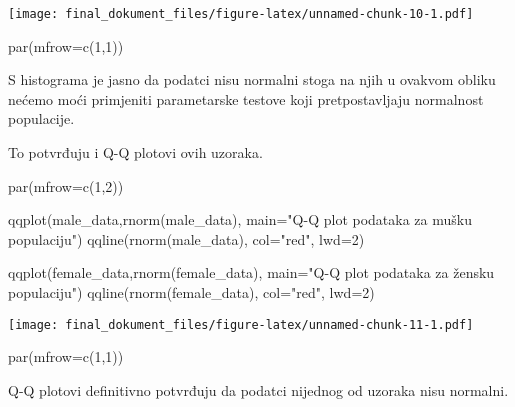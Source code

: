\documentclass[
]{article}
\newenvironment{Shaded}{\begin{snugshade}}{\end{snugshade}}
\newcommand{\AttributeTok}[1]{\textcolor[rgb]{0.77,0.63,0.00}{#1}}
\newcommand{\DecValTok}[1]{\textcolor[rgb]{0.00,0.00,0.81}{#1}}
\newcommand{\FunctionTok}[1]{\textcolor[rgb]{0.00,0.00,0.00}{#1}}
\newcommand{\NormalTok}[1]{#1}
\newcommand{\StringTok}[1]{\textcolor[rgb]{0.31,0.60,0.02}{#1}}
\begin{document}
\texttt{[image: final\_dokument\_files/figure-latex/unnamed-chunk-10-1.pdf]}

\begin{Shaded}
\begin{Highlighting}[]
\FunctionTok{par}\NormalTok{(}\AttributeTok{mfrow=}\FunctionTok{c}\NormalTok{(}\DecValTok{1}\NormalTok{,}\DecValTok{1}\NormalTok{))}
\end{Highlighting}
\end{Shaded}

S histograma je jasno da podatci nisu normalni stoga na njih u ovakvom
obliku nećemo moći primjeniti parametarske testove koji pretpostavljaju
normalnost populacije.

To potvrđuju i Q-Q plotovi ovih uzoraka.

\begin{Shaded}
\begin{Highlighting}[]
\FunctionTok{par}\NormalTok{(}\AttributeTok{mfrow=}\FunctionTok{c}\NormalTok{(}\DecValTok{1}\NormalTok{,}\DecValTok{2}\NormalTok{))}

\FunctionTok{qqplot}\NormalTok{(male\_data,}\FunctionTok{rnorm}\NormalTok{(male\_data), }\AttributeTok{main=}\StringTok{"Q{-}Q plot podataka za mušku populaciju"}\NormalTok{)}
\FunctionTok{qqline}\NormalTok{(}\FunctionTok{rnorm}\NormalTok{(male\_data), }\AttributeTok{col=}\StringTok{"red"}\NormalTok{, }\AttributeTok{lwd=}\DecValTok{2}\NormalTok{)}

\FunctionTok{qqplot}\NormalTok{(female\_data,}\FunctionTok{rnorm}\NormalTok{(female\_data), }\AttributeTok{main=}\StringTok{"Q{-}Q plot podataka za žensku populaciju"}\NormalTok{)}
\FunctionTok{qqline}\NormalTok{(}\FunctionTok{rnorm}\NormalTok{(female\_data), }\AttributeTok{col=}\StringTok{"red"}\NormalTok{, }\AttributeTok{lwd=}\DecValTok{2}\NormalTok{)}
\end{Highlighting}
\end{Shaded}

\texttt{[image: final\_dokument\_files/figure-latex/unnamed-chunk-11-1.pdf]}

\begin{Shaded}
\begin{Highlighting}[]
\FunctionTok{par}\NormalTok{(}\AttributeTok{mfrow=}\FunctionTok{c}\NormalTok{(}\DecValTok{1}\NormalTok{,}\DecValTok{1}\NormalTok{))}
\end{Highlighting}
\end{Shaded}

Q-Q plotovi definitivno potvrđuju da podatci nijednog od uzoraka nisu
normalni.
\end{document}

